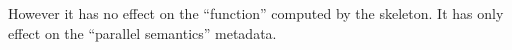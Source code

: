 However it has no effect on the “function” computed by the skeleton. It has only effect on the “parallel semantics” metadata.


